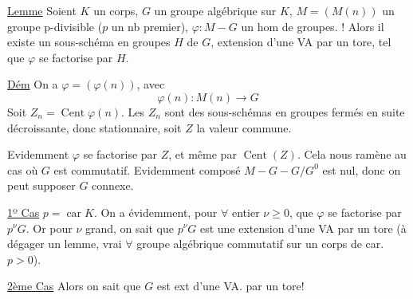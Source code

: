 \uline{Lemme} Soient $K$ un corps, $G$ un groupe algébrique sur $K$, $M=(M(n))$ un groupe p-divisible ($p$ un nb premier),  $\varphi:M\mathbin{-}G$ un hom de groupes. ! Alors  il existe un sous-schéma en groupes $H$ de $G$, extension d'une VA par un tore, tel que $\varphi$ se factorise par $H$.

\uline{Dém} On a $\varphi=(\varphi(n))$, avec
\[
\varphi(n):M(n)\longrightarrow G
\]
Soit $Z_n=\operatorname{Cent}\varphi(n)$. Les $Z_n$ sont des sous-schémas en groupes fermés en suite décroissante, donc stationnaire, soit $Z$ la valeur commune.

Evidemment $\varphi$ se factorise par  $Z$, et même par $\operatorname{Cent}(Z)$. Cela nous ramène au cas où $G$ est commutatif. Evidemment   composé $M\mathbin{-}G\mathbin{-}G/G^0$ est nul, donc on peut supposer $G$ connexe.

\uline{1º Cas} $p=\operatorname{car}K$. On a évidemment, pour $\forall$ entier $\nu\geq0$, que $\varphi$ se factorise par $p^\nu G$. Or pour $\nu$ grand, on sait  que $p^\nu G$ est une extension d'une VA par un tore (à dégager un lemme, vrai $\forall$ groupe algébrique commutatif sur un corps de car. $p>0$).

\uline{2ème Cas}  
Alors on sait que $G$ est ext d'une VA. par un tore!

